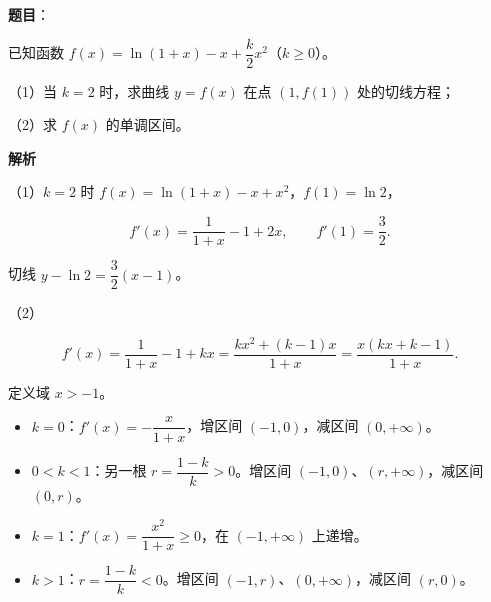 \begin{answer}

\textbf{题目}：

已知函数 $f(x)=\ln(1+x)-x+\dfrac k2x^2$（$k\geqslant0$）。

（1）当 $k=2$ 时，求曲线 $y=f(x)$ 在点 $(1,f(1))$ 处的切线方程；

（2）求 $f(x)$ 的单调区间。

\textbf{解析}

（1）$k=2$ 时 $f(x)=\ln(1+x)-x+x^2$，$f(1)=\ln2$，

\nopagebreak[4]
\[f'(x)=\frac1{1+x}-1+2x,\qquad f'(1)=\frac32.\]

切线 $y-\ln2=\dfrac32(x-1)$。

（2）

\nopagebreak[4]
\[f'(x)=\frac1{1+x}-1+kx
=\frac{kx^2+(k-1)x}{1+x}
=\frac{x(kx+k-1)}{1+x}.\]

定义域 $x>-1$。

\begin{itemize}
\item $k=0$：$f'(x)=-\dfrac x{1+x}$，增区间 $(-1,0)$，减区间 $(0,+\infty)$。
\item $0<k<1$：另一根 $r=\dfrac{1-k}{k}>0$。增区间 $(-1,0)$、$(r,+\infty)$，减区间 $(0,r)$。
\item $k=1$：$f'(x)=\dfrac{x^2}{1+x}\geqslant0$，在 $(-1,+\infty)$ 上递增。
\item $k>1$：$r=\dfrac{1-k}{k}<0$。增区间 $(-1,r)$、$(0,+\infty)$，减区间 $(r,0)$。
\end{itemize}


\end{answer}

